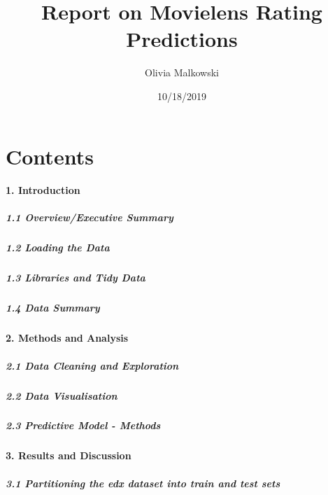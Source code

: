 \documentclass[]{article}
\title{Report on Movielens Rating Predictions}
\author{Olivia Malkowski}
\date{10/18/2019}
\let\oldparagraph\paragraph
\renewcommand{\paragraph}[1]{\oldparagraph{#1}\mbox{}}
\let\oldsubparagraph\subparagraph
\renewcommand{\subparagraph}[1]{\oldsubparagraph{#1}\mbox{}}
\begin{document}
\maketitle

\hypertarget{contents}{%
\section{Contents}\label{contents}}

\hypertarget{introduction}{%
\paragraph{1. Introduction}\label{introduction}}

\hypertarget{overviewexecutive-summary}{%
\subparagraph{1.1 Overview/Executive
Summary}\label{overviewexecutive-summary}}

\hypertarget{loading-the-data}{%
\subparagraph{1.2 Loading the Data}\label{loading-the-data}}

\hypertarget{libraries-and-tidy-data}{%
\subparagraph{1.3 Libraries and Tidy
Data}\label{libraries-and-tidy-data}}

\hypertarget{data-summary}{%
\subparagraph{1.4 Data Summary}\label{data-summary}}

\hypertarget{methods-and-analysis}{%
\paragraph{2. Methods and Analysis}\label{methods-and-analysis}}

\hypertarget{data-cleaning-and-exploration}{%
\subparagraph{2.1 Data Cleaning and
Exploration}\label{data-cleaning-and-exploration}}

\hypertarget{data-visualisation}{%
\subparagraph{2.2 Data Visualisation}\label{data-visualisation}}

\hypertarget{predictive-model---methods}{%
\subparagraph{2.3 Predictive Model -
Methods}\label{predictive-model---methods}}

\hypertarget{results-and-discussion}{%
\paragraph{3. Results and Discussion}\label{results-and-discussion}}

\hypertarget{partitioning-the-edx-dataset-into-train-and-test-sets}{%
\subparagraph{3.1 Partitioning the edx dataset into train and test
sets}\label{partitioning-the-edx-dataset-into-train-and-test-sets}}
\end{document}
